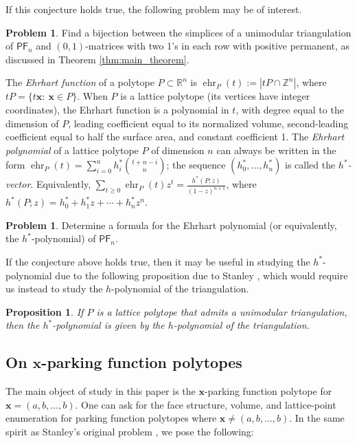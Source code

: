 \documentclass[11pt]{amsart}
\newtheorem{proposition}[theorem]{Proposition}
\theoremstyle{definition}
\newtheorem{problem}[theorem]{Problem}
\newcommand{\0}{\emptyset}
\newcommand{\R}{\mathbb{R}}
\newcommand{\Z}{\mathbb{Z}}
\newcommand{\bx}{\mathbf{x}}
\newcommand{\PF}{\mathsf{PF}}
\begin{document}
If this conjecture holds true, the following problem may be of interest.

\begin{problem}
Find a bijection between the simplices of a unimodular triangulation of $\PF_n$ and $(0,1)$-matrices with two 1's in each row with positive permanent, as discussed in Theorem \ref{thm:main_theorem}.
\end{problem}

The \emph{Ehrhart function} of a polytope $P\subset \R^n$ is $\operatorname{ehr}_P(t):=|tP\cap \Z^n|$, where $tP=\{t\bx:\ \bx\in P\}$.
When $P$ is a lattice polytope (its vertices have integer coordinates), the Ehrhart function is a polynomial in $t$, with degree equal to the dimension of $P$, leading coefficient equal to its normalized volume, second-leading coefficient equal to half the surface area, and constant coefficient 1.
The \emph{Ehrhart polynomial} of a lattice polytope $P$ of dimension $n$ can always be written in the form $\operatorname{ehr}_P(t)=\sum_{i=0}^nh_i^*\binom{t+n-i}{n}$; the sequence $(h_0^*,\dots,h_n^*)$ is called the \emph{$h^*$-vector}. 
Equivalently, $\sum_{t\geq 0}\operatorname{ehr}_P(t)z^t=\frac{h^*(P;z)}{(1-z)^{n+1}}$, where $h^*(P;z)=h_0^*+h_1^*z+\cdots+h_n^*z^n$.

\begin{problem}
Determine a formula for the Ehrhart polynomial (or equivalently, the $h^*$-polynomial) of $\PF_n$.   
\end{problem}

If the conjecture above holds true, then it may be useful in studying the $h^*$-polynomial due to the following proposition due to Stanley \cite{StanleyDecompositions}, which would require us instead to study the $h$-polynomial of the triangulation. 

\begin{proposition}
If $P$ is a lattice polytope that admits a unimodular triangulation, then the $h^*$-polynomial is given by the $h$-polynomial of the triangulation.     
\end{proposition}


\subsection{On \texorpdfstring{$\mathbf{x}$}{\textbf{x}}-parking function polytopes}\label{sec:general-x}
The main object of study in this paper is the $\bx$-parking function polytope for $\bx=(a,b,\dots,b)$. 
One can ask for the face structure, volume, and lattice-point enumeration for parking function polytopes where $\bx\neq (a,b,\dots,b)$.
In the same spirit as Stanley's original problem \cite{Sta}, we pose the following:
\end{document}

